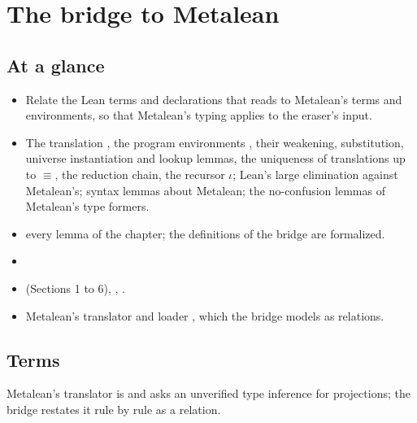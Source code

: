 \chapter{The bridge to Metalean}\label{chap:model}

\section*{At a glance}
\begin{itemize}
\item {} Relate the Lean terms and declarations that  reads to Metalean's
  terms and environments, so that Metalean's typing applies to the eraser's input.
\item {} The translation , the program environments ,
  their weakening, substitution, universe instantiation and lookup lemmas, the uniqueness of
  translations up to $\equiv$, the  reduction chain, the recursor $\iota$; Lean's
  large elimination against Metalean's; syntax lemmas about Metalean; the no-confusion lemmas of
  Metalean's type formers.
\item {} \stProved{} every lemma of the chapter; the definitions of the bridge are
  formalized.
\item {} 
\item {}  (Sections 1 to 6),
  , .
\item {} Metalean's translator  and
  loader , which the bridge models as relations.
\end{itemize}

\section{Terms}\label{sec:model-terms}

Metalean's translator is  and asks an unverified type inference for projections;
the bridge restates it rule by rule as a relation.

